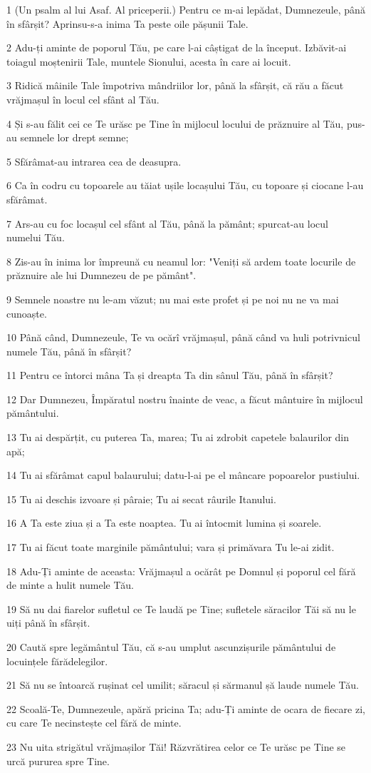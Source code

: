 \par 1 (Un psalm al lui Asaf. Al priceperii.) Pentru ce m-ai lepădat, Dumnezeule, până în sfârșit? Aprinsu-s-a inima Ta peste oile pășunii Tale.
\par 2 Adu-ți aminte de poporul Tău, pe care l-ai câștigat de la început. Izbăvit-ai toiagul moștenirii Tale, muntele Sionului, acesta în care ai locuit.
\par 3 Ridică mâinile Tale împotriva mândriilor lor, până la sfârșit, că rău a făcut vrăjmașul în locul cel sfânt al Tău.
\par 4 Și s-au fălit cei ce Te urăsc pe Tine în mijlocul locului de prăznuire al Tău, pus-au semnele lor drept semne;
\par 5 Sfărâmat-au intrarea cea de deasupra.
\par 6 Ca în codru cu topoarele au tăiat ușile locașului Tău, cu topoare și ciocane l-au sfărâmat.
\par 7 Ars-au cu foc locașul cel sfânt al Tău, până la pământ; spurcat-au locul numelui Tău.
\par 8 Zis-au în inima lor împreună cu neamul lor: "Veniți să ardem toate locurile de prăznuire ale lui Dumnezeu de pe pământ".
\par 9 Semnele noastre nu le-am văzut; nu mai este profet și pe noi nu ne va mai cunoaște.
\par 10 Până când, Dumnezeule, Te va ocărî vrăjmașul, până când va huli potrivnicul numele Tău, până în sfârșit?
\par 11 Pentru ce întorci mâna Ta și dreapta Ta din sânul Tău, până în sfârșit?
\par 12 Dar Dumnezeu, Împăratul nostru înainte de veac, a făcut mântuire în mijlocul pământului.
\par 13 Tu ai despărțit, cu puterea Ta, marea; Tu ai zdrobit capetele balaurilor din apă;
\par 14 Tu ai sfărâmat capul balaurului; datu-l-ai pe el mâncare popoarelor pustiului.
\par 15 Tu ai deschis izvoare și pâraie; Tu ai secat râurile Itanului.
\par 16 A Ta este ziua și a Ta este noaptea. Tu ai întocmit lumina și soarele.
\par 17 Tu ai făcut toate marginile pământului; vara și primăvara Tu le-ai zidit.
\par 18 Adu-Ți aminte de aceasta: Vrăjmașul a ocărât pe Domnul și poporul cel fără de minte a hulit numele Tău.
\par 19 Să nu dai fiarelor sufletul ce Te laudă pe Tine; sufletele săracilor Tăi să nu le uiți până în sfârșit.
\par 20 Caută spre legământul Tău, că s-au umplut ascunzișurile pământului de locuințele fărădelegilor.
\par 21 Să nu se întoarcă rușinat cel umilit; săracul și sărmanul șă laude numele Tău.
\par 22 Scoală-Te, Dumnezeule, apără pricina Ta; adu-Ți aminte de ocara de fiecare zi, cu care Te necinstește cel fără de minte.
\par 23 Nu uita strigătul vrăjmașilor Tăi! Răzvrătirea celor ce Te urăsc pe Tine se urcă pururea spre Tine.

